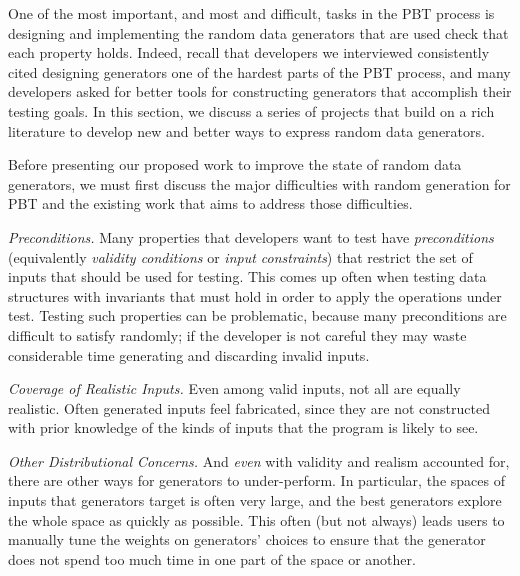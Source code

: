 
One of the most important, and most and difficult, tasks in the PBT process is
designing and implementing the random data generators that are used check that
each property holds. Indeed, recall that developers we interviewed consistently
cited designing generators one of the hardest parts of the PBT process, and many
developers asked for better tools for constructing generators that accomplish
their testing goals. In this section, we discuss a series of projects that build
on a rich literature to develop new and better ways to express random data
generators.

%
Before presenting our proposed work to improve the state of random data
generators, we must first discuss the major difficulties with random generation
for PBT and the existing work that aims to address those difficulties.


{\em Preconditions.}
Many properties that developers want to test have {\em preconditions}
(equivalently {\em validity conditions} or {\em input constraints}) that
restrict the set of inputs that should be used for testing. This comes up often
when testing data structures with invariants that must hold in order to apply
the operations under test. Testing such properties can be problematic, because
many preconditions are difficult to satisfy randomly; if the developer is not
careful they may waste considerable time generating and discarding invalid inputs.

{\em Coverage of Realistic Inputs.}
Even among valid inputs, not all are equally realistic. Often generated inputs
feel fabricated, since they are not constructed with prior knowledge of the
kinds of inputs that the program is likely to see.

{\em Other Distributional Concerns.}
And {\em even} with validity and realism accounted for, there are other ways for
generators to under-perform. In particular, the spaces of inputs that generators
target is often very large, and the best generators explore the whole space as
quickly as possible. This often (but not always) leads users to manually tune
the weights on generators' choices to ensure that the generator does not spend
too much time in one part of the space or another.


